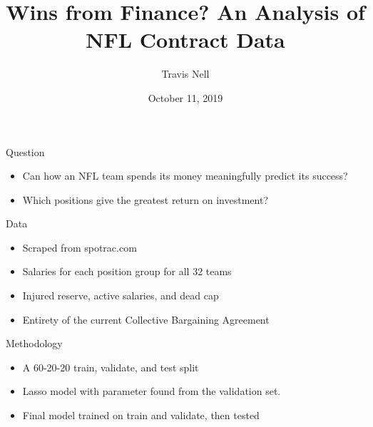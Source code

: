 \documentclass[11pt]{beamer}
\author{Travis Nell}
\title{Wins from Finance? An Analysis of NFL Contract Data}
\date{October 11, 2019}
\begin{document}
\begin{frame}
\titlepage
\end{frame}

\begin{frame}{Question}

\begin{itemize}

\item Can how an NFL team spends its money meaningfully predict its success?

\item Which positions give the greatest return on investment?

\end{itemize}

\end{frame}

\begin{frame}{Data}

\begin{itemize}

\item Scraped from spotrac.com

\item Salaries for each position group for all 32 teams

\item Injured reserve, active salaries, and dead cap 

\item Entirety of the current Collective Bargaining Agreement

\end{itemize}

\end{frame}

\begin{frame}{Methodology}

\begin{itemize}

\item A 60-20-20 train, validate, and test split

\item Lasso model with parameter found from the validation set.


\item Final model trained on train and validate, then tested


\end{itemize}

\end{frame}
\end{document}
